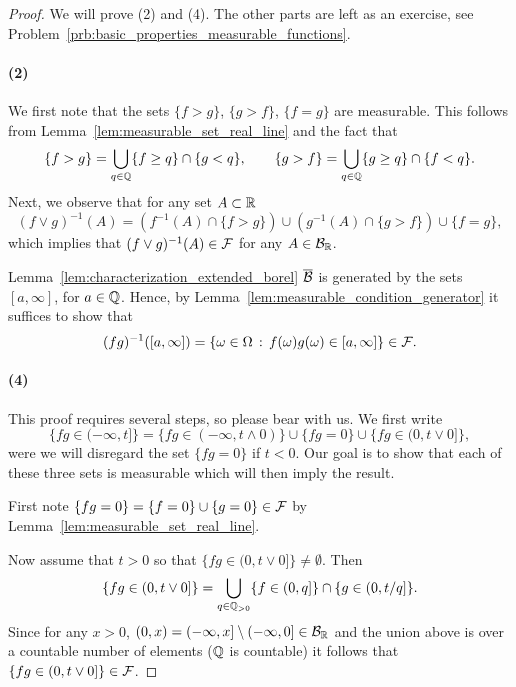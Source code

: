 \begin{proof}
We will prove (2) and (4). The other parts are left as an exercise, see Problem~\ref{prb:basic_properties_measurable_functions}.

\paragraph{(2)} We first note that the sets $\{f > g\}$, $\{g > f\}$, $\{f=g\}$ are measurable. This follows from Lemma~\ref{lem:measurable_set_real_line} and the fact that
\[
	\{f > g\} = \bigcup_{q \in \mathbb Q} \{f \ge q\} \cap \{g < q\},\qquad \{g > f\} = \bigcup_{q \in \mathbb Q} \{g \ge q\} \cap \{f < q\}.
\]
Next, we observe that for any set $A \subset \mathbb R$
\[
	(f \vee g)^{-1}(A) = \left(f^{-1}(A) \cap \{f > g\}\right) \cup \left(g^{-1}(A) \cap \{g > f\}\right) \cup \{f=g\},
\]
which implies that $(f \vee g)^{-1}(A) \in \mathcal F$ for any $A \in \mathcal B_{\mathbb R}$.

Lemma~\ref{lem:characterization_extended_borel} $\overline{\mathcal B}$ is generated by the sets $[a,\infty]$, for $a \in \mathbb Q$. Hence, by Lemma~\ref{lem:measurable_condition_generator} it suffices to show that 
\[
	(fg)^{-1}([a,\infty]) = \{\omega \in \Omega \, : \, f(\omega) g(\omega) \in [a, \infty]\} \in \mathcal F.
\]

\paragraph{(4)} This proof requires several steps, so please bear with us. We first write
\[
	\{fg \in (-\infty, t]\} = \{fg \in (-\infty, t \wedge 0)\} \cup \{fg = 0\} \cup \{fg \in (0,t \vee 0]\},
\]
were we will disregard the set $\{fg = 0\}$ if $t < 0$. Our goal is to show that each of these three sets is measurable which will then imply the result.

First note $\{fg = 0\} = \{f = 0\} \cup \{g = 0\} \in \mathcal F$ by Lemma~\ref{lem:measurable_set_real_line}.

Now assume that $t > 0$ so that $\{fg \in (0,t \vee 0]\} \ne \emptyset$. Then
\[
	\{fg \in (0,t \vee 0]\} = \bigcup_{q \in \mathbb Q_{>0}} \{f \in (0,q]\} \cap \{g \in (0,t/q]\}.
\]
Since for any $x >0$, $(0,x) = (-\infty,x] \setminus (-\infty,0] \in \mathcal B_{\mathbb R}$ and the union above is over a countable number of elements ($\mathbb Q$ is countable) it follows that $\{fg \in (0,t \vee 0]\} \in \mathcal F$.


\end{proof}
